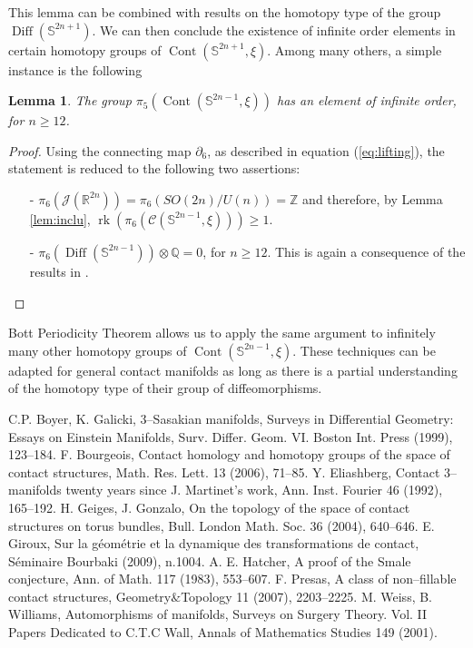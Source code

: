 \documentclass[10pt]{amsart}
\newtheorem{lemma}[proposition]{Lemma}
\begin{document}
\noindent This lemma can be combined with results on the homotopy type of the group ${\operatorname{Diff}}({\mathbb{S}}^{2n+1})$. We can then conclude the existence of infinite order elements in certain homotopy groups of ${\operatorname{Cont}}({\mathbb{S}}^{2n+1},\xi)$. Among many others, a simple instance is the following
\begin{lemma}
The group $\pi_5({\operatorname{Cont}}({\mathbb{S}}^{2n-1},\xi))$ has an element of infinite order, for $n \geq 12$.
\end{lemma}
\begin{proof}
Using the connecting map $\partial_6$, as described in equation (\ref{eq:lifting}), the statement is reduced to the following two assertions:
\begin{itemize}
\item[-] $\pi_6({{\mathcal{J}}}({\mathbb{R}}^{2n}))= \pi_6(SO(2n)/U(n))={\mathbb{Z}}$ and therefore, by Lemma \ref{lem:inclu}, ${\operatorname{rk}}(\pi_6({\mathcal{C}}({\mathbb{S}}^{2n-1},\xi)))\geq 1$.
\item[-] $\pi_6({\operatorname{Diff}}({\mathbb{S}}^{2n-1})) \otimes {\mathbb{Q}}=0$, for $n\geq 12$. This is again a consequence of the results in \cite{We}.
\end{itemize}
\end{proof}
\noindent Bott Periodicity Theorem allows us to apply the same argument to infinitely many other homotopy groups of ${\operatorname{Cont}}({\mathbb{S}}^{2n-1},\xi)$. These techniques can be adapted for general contact manifolds as long as there is a partial understanding of the homotopy type of their group of diffeomorphisms.
\begin{thebibliography}{xxxx}
 C.P. Boyer, K. Galicki, $3$--Sasakian manifolds, Surveys in Differential Geometry: Essays on Einstein Manifolds, Surv. Differ. Geom. VI. Boston Int. Press (1999), 123--184.
 F. Bourgeois, Contact homology and homotopy groups of the space of contact structures, Math. Res. Lett. 13 (2006), 71--85.
 Y. Eliashberg, Contact $3$--manifolds twenty years since J. Martinet's work, Ann. Inst. Fourier 46 (1992), 165--192.
 H. Geiges, J. Gonzalo, On the topology of the space of contact structures on torus bundles, Bull. London Math. Soc. 36 (2004), 640--646.
 E. Giroux, Sur la g\'eom\'etrie et la dynamique des transformations de contact, S\'eminaire Bourbaki (2009), n.1004.
 A. E. Hatcher, A proof of the Smale conjecture, Ann. of Math. 117 (1983), 553--607.
 F. Presas, A class of non--fillable contact structures, Geometry$\&$Topology 11 (2007), 2203--2225.
 M. Weiss, B. Williams, Automorphisms of manifolds, Surveys on Surgery Theory. Vol. II Papers Dedicated to C.T.C Wall, Annals of Mathematics Studies 149 (2001).
\end{thebibliography}
\end{document}

